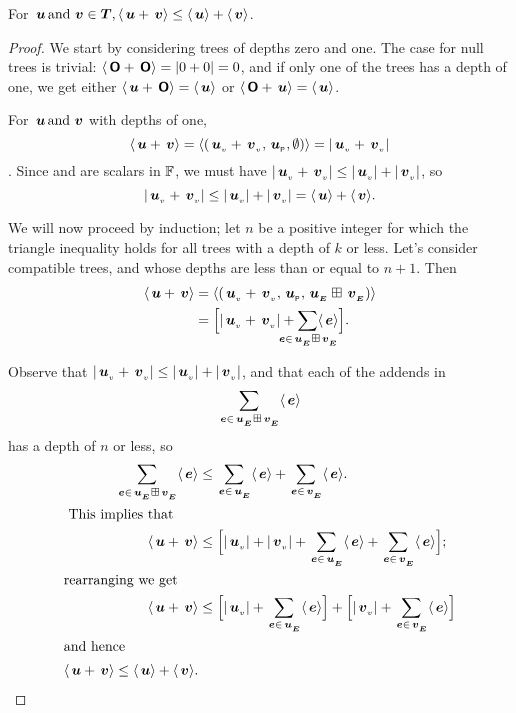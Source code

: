 \begin{proposition}\label{triangle1}
  For \(\node{u} \mand \node{v} \in \DOM, \nabs{\node{u} + \node{v}}
  \leq \nabs{\node{u}} + \nabs{\node{v}}\).

\begin{proof}
  We start by considering trees of depths zero and one. The case for null trees is trivial: \(\nabs{\zerotree +
    \zerotree} = \abs{0 + 0} = 0\), and if only one of the trees has a depth of one, we get either \(\nabs{\node{u} +
    \zerotree} = \nabs{\node{u}}\) or \(\nabs{\zerotree + \node{u}} = \nabs{\node{u}}\).

  For \(\node{u} \mand \node{v}\)  with depths of one, \[\nabs{\node{u} + \node{v}} = \nabs{(\nv{u}+\nv{v}, \nlabel{u}, \emptyset)}= \abs{\nv{u}+\nv{v}}\].
  Since  and  are scalars in $\FIELD$, we must have
  \(\abs{\nv{u} + \nv{v}} \leq \abs{\nv{u}}+\abs{\nv{v}}\),
  so \[\abs{\nv{u}+\nv{v}} \leq \abs{\nv{u}}+\abs{\nv{v}} = \nabs{\node{u}} + \nabs{\node{v}}.\]

  We will now proceed by induction; let \(n\) be a positive integer for which the triangle inequality holds for all
  trees with a depth of \(k\) or less.  Let's consider compatible trees,  and  whose depths are less
  than or equal to \(n+1\). Then
  \begin{align*}
      \nabs{\node{u} + \node{v}} &= \nabs{(\nv{u} + \nv{v}, \nlabel{u}, \extn{u}\stplus\extn{v})} \\
      &= \Bigl[\abs{\nv{u} + \nv{v}} + \mstsum{\node{e}\in{\extn{u}\stplus\extn{v}}}\nabs{\node{e}}\Bigr]. \\
  \end{align*}
  
  Observe that \(\abs{\nv{u} + \nv{v}} \leq \abs{\nv{u}} + \abs{\nv{v}}\), and that each 
  of the addends in \[\sum_{\node{e}\in{\extn{u}\stplus\extn{v}}}\nabs{\node{e}}\] has a depth of \(n\) or
  less, so 
\begin{align*}
  \sum_{\node{e}\in{\extn{u}\stplus\extn{v}}}\nabs{\node{e}} &\leq \sum_{\node{e}\in{\extn{u}}}\nabs{\node{e}} + \sum_{\node{e}\in\extn{v}}\nabs{\node{e}}.\\
  \intertext{ This implies that}
   \nabs{\node{u} + \node{v}} &\leq \Bigl[\abs{\nv{u}} + \abs{\nv{v}} + \sum_{\node{e}\in\extn{u}}\nabs{\node{e}} + \sum_{\node{e}\in\extn{v}}\nabs{\node{e}}\Bigr];\\
   \intertext{rearranging we get}
   \nabs{\node{u} + \node{v}}  &\leq \Bigl[\abs{\nv{u}} + \sum_{\node{e}\in\extn{u}}\nabs{\node{e}}\Bigr] + \Bigl[\abs{\nv{v}} + \sum_{\node{e}\in\extn{v}}\nabs{\node{e}}\Bigr] \\
   \intertext{and hence}
   \nabs{\node{u} + \node{v}} \leq \nabs{\node{u}}  + \nabs{\node{v}}.
\end{align*}
\end{proof}
\end{proposition}


